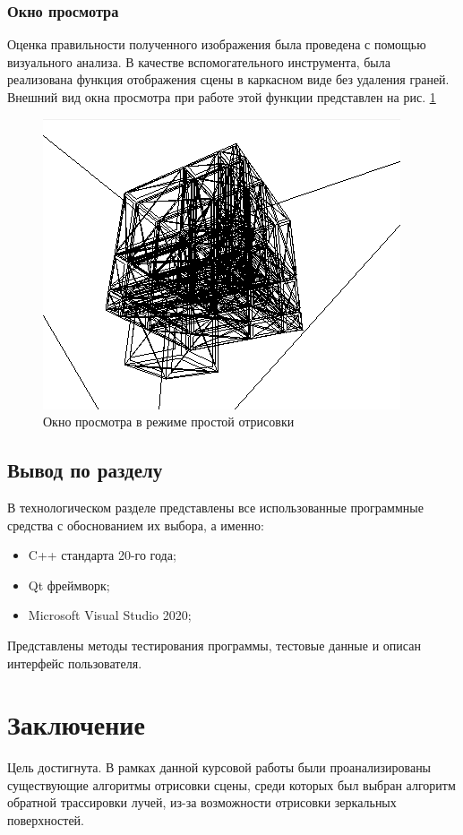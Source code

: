 \subsubsection{Окно просмотра}
Оценка правильности полученного изображения была проведена с помощью визуального анализа. В качестве вспомогательного инструмента, была реализована функция отображения сцены в каркасном виде без удаления граней. Внешний вид окна просмотра при работе этой функции представлен на рис. \ref{fig:scenecarcass}

\begin{figure}[ht]
	\centering
	\includegraphics[width=0.7\linewidth]{img/scene_carcass}
	\caption{Окно просмотра в режиме простой отрисовки}
	\label{fig:scenecarcass}
\end{figure}

\subsection{Вывод по разделу}
В технологическом разделе представлены все использованные программные средства с обоснованием их выбора, а именно:
\begin{itemize}
	\item C++ стандарта 20-го года;
	\item Qt фреймворк;
	\item Microsoft Visual Studio 2020;
\end{itemize}

Представлены методы тестирования программы, тестовые данные и описан интерфейс пользователя.

\section*{Заключение}
Цель достигнута. В рамках данной курсовой работы были проанализированы существующие алгоритмы отрисовки сцены, среди которых был выбран алгоритм обратной трассировки лучей, из-за возможности отрисовки зеркальных поверхностей.

